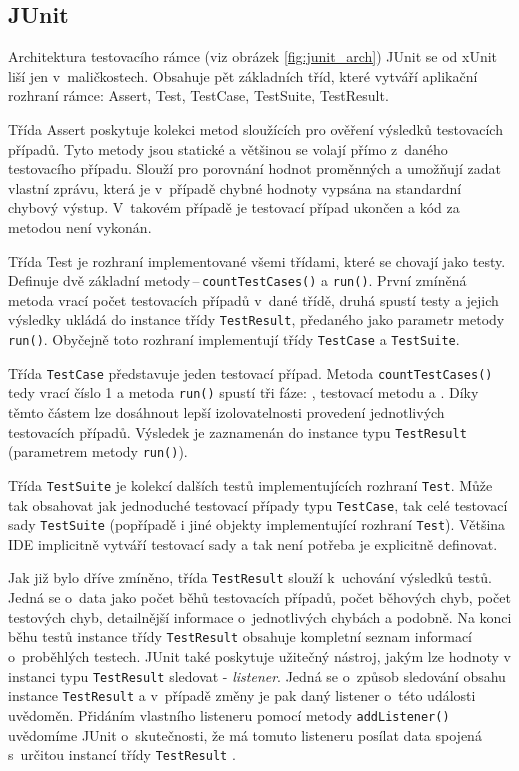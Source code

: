     \subsection{JUnit}
    \label{section:JUnit}
    Architektura testovacího rámce (viz obrázek \ref{fig:junit_arch}) JUnit se od xUnit liší jen v~maličkostech. Obsahuje pět základních tříd, které vytváří aplikační rozhraní rámce: Assert, Test, TestCase, TestSuite, TestResult.

    Třída Assert poskytuje kolekci metod sloužících pro ověření výsledků testovacích případů. Tyto metody jsou statické a většinou se volají přímo z~daného testovacího případu. Slouží pro porovnání hodnot proměnných a umožňují zadat vlastní zprávu, která je v~případě chybné hodnoty vypsána na standardní chybový výstup. V~takovém případě je testovací případ ukončen a kód za metodou není vykonán.

    Třída Test je rozhraní implementované všemi třídami, které se chovají jako testy. Definuje dvě základní metody\,--\,\texttt{countTestCases()} a \texttt{run()}. První zmíněná metoda vrací počet testovacích případů v~dané třídě, druhá spustí testy a jejich výsledky ukládá do instance třídy \texttt{TestResult}, předaného jako parametr metody \texttt{run()}. Obyčejně toto rozhraní implementují třídy \texttt{TestCase} a \texttt{TestSuite}.

    Třída \texttt{TestCase} představuje jeden testovací případ. Metoda \texttt{countTestCases()} tedy vrací číslo 1 a metoda \texttt{run()} spustí tři fáze: , testovací metodu a . Díky těmto částem lze dosáhnout lepší izolovatelnosti provedení jednotlivých testovacích případů. Výsledek je zaznamenán do instance typu \texttt{TestResult} (parametrem metody \texttt{run()}).

    Třída \texttt{TestSuite} je kolekcí dalších testů implementujících rozhraní \texttt{Test}. Může tak obsahovat jak jednoduché testovací případy typu \texttt{TestCase}, tak celé testovací sady \texttt{TestSuite} (popřípadě i jiné objekty implementující rozhraní \texttt{Test}). Většina IDE implicitně vytváří testovací sady a tak není potřeba je explicitně definovat.

    Jak již bylo dříve zmíněno, třída \texttt{TestResult} slouží k~uchování výsledků testů. Jedná se o~data jako počet běhů testovacích případů, počet běhových chyb, počet testových chyb, detailnější informace o~jednotlivých chybách a podobně. Na konci běhu testů instance třídy \texttt{TestResult} obsahuje kompletní seznam informací o~proběhlých testech. JUnit také poskytuje užitečný nástroj, jakým lze hodnoty v instanci typu \texttt{TestResult} sledovat - \emph{listener}. Jedná se o~způsob sledování obsahu instance \texttt{TestResult} a v~případě změny je pak daný listener o~této události uvědoměn. Přidáním vlastního listeneru pomocí metody \texttt{addListener()} uvědomíme JUnit o~skutečnosti, že má tomuto listeneru posílat data spojená s~určitou instancí třídy \texttt{TestResult} \cite{JUnitGuide}.


